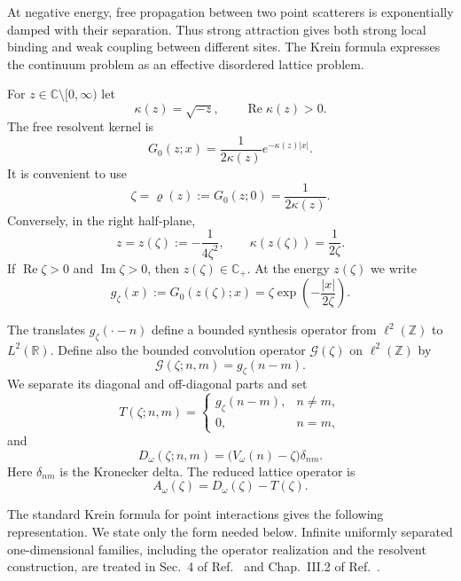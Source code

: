 \documentclass[12pt,a4paper]{article}
\numberwithin{equation}{section}
\newcommand{\refcite}[1]{\cite{#1}}
\newcommand{\R}{\mathbb R}
\newcommand{\C}{\mathbb C}
\newcommand{\Z}{\mathbb Z}
\newcommand{\cG}{\mathcal G}
\renewcommand{\Re}{\operatorname{Re}}
\renewcommand{\Im}{\operatorname{Im}}
\begin{document}
At negative energy, free propagation between two point scatterers is
exponentially damped with their separation.  Thus strong attraction gives both strong local binding and weak coupling
between different sites.
The Krein formula expresses the continuum problem as an effective disordered
lattice problem.

For $z\in\C\setminus[0,\infty)$ let
$$
\kappa(z)=\sqrt{-z},\qquad \Re\kappa(z)>0.
$$
The free resolvent kernel is
\begin{equation}
G_0(z;x)=\frac{1}{2\kappa(z)}e^{-\kappa(z)|x|}.
\label{free-kernel}
\end{equation}
It is convenient to use
\begin{equation}
\zeta=\varrho(z):=G_0(z;0)=\frac{1}{2\kappa(z)}.
\label{rho}
\end{equation}
Conversely, in the right half-plane,
\begin{equation}
z=z(\zeta):=-\frac{1}{4\zeta^2},
\qquad
\kappa(z(\zeta))=\frac{1}{2\zeta}.
\label{zeta-map}
\end{equation}
If $\Re\zeta>0$ and $\Im\zeta>0$, then $z(\zeta)\in\C_+$.
At the energy $z(\zeta)$ we write
\begin{equation}
g_\zeta(x):=G_0(z(\zeta);x)
 =\zeta\exp\left(-\frac{|x|}{2\zeta}\right).
\label{g-zeta}
\end{equation}

The translates $g_\zeta(\cdot-n)$ define a bounded synthesis operator
from $\ell^2(\Z)$ to $L^2(\R)$.  Define also the bounded convolution
operator $\cG(\zeta)$ on $\ell^2(\Z)$ by
$$
\cG(\zeta;n,m)=g_\zeta(n-m).
$$
We separate its diagonal and off-diagonal parts and set
\begin{equation}
T(\zeta;n,m)=
\begin{cases}
 g_\zeta(n-m),&n\ne m,\\
 0,&n=m,
\end{cases}
\label{Tdef}
\end{equation}
and
\begin{equation}
D_\omega(\zeta;n,m)=\bigl(V_\omega(n)-\zeta\bigr)\delta_{nm}.
\label{Ddef}
\end{equation}
Here $\delta_{nm}$ is the Kronecker delta.  The reduced lattice operator is
\begin{equation}
A_\omega(\zeta)=D_\omega(\zeta)-T(\zeta).
\label{Adef}
\end{equation}

The standard Krein formula for point interactions gives the following
representation.  We state only the form needed below.  Infinite uniformly
separated one-dimensional families, including the operator realization and
the resolvent construction, are treated in Sec.~4 of
Ref.~\refcite{AlbeverioEtAl1984} and Chap.~III.2 of
Ref.~\refcite{Albeverio2005}.
\end{document}
